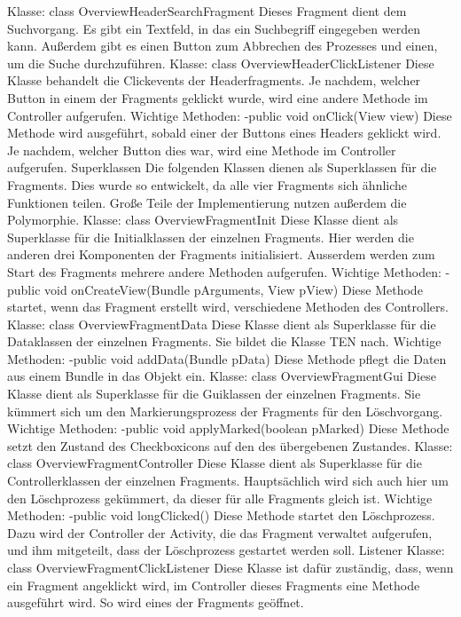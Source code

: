 Klasse: class OverviewHeaderSearchFragment
Dieses Fragment dient dem Suchvorgang. Es gibt ein Textfeld, in das ein Suchbegriff eingegeben werden kann. Außerdem gibt es einen Button zum Abbrechen des Prozesses und einen, um die Suche durchzuführen.
Klasse: class OverviewHeaderClickListener
Diese Klasse behandelt die Clickevents der Headerfragments. Je nachdem, welcher Button in einem der Fragments geklickt wurde, wird eine andere Methode im Controller aufgerufen.
Wichtige Methoden:
-public void onClick(View view)
Diese Methode wird ausgeführt, sobald einer der Buttons eines Headers geklickt wird. Je nachdem, welcher Button dies war, wird eine Methode im Controller aufgerufen.
Superklassen
Die folgenden Klassen dienen als Superklassen für die Fragments. Dies wurde so entwickelt, da alle vier Fragments sich ähnliche Funktionen teilen. Große Teile der Implementierung nutzen außerdem die Polymorphie.
Klasse: class OverviewFragmentInit
Diese Klasse dient als Superklasse für die Initialklassen der einzelnen Fragments. Hier werden die anderen drei Komponenten der Fragments initialisiert. Ausserdem werden zum Start des Fragments mehrere andere Methoden aufgerufen.
Wichtige Methoden:
-public void onCreateView(Bundle pArguments, View pView)
Diese Methode startet, wenn das Fragment erstellt wird, verschiedene Methoden des Controllers.
Klasse: class OverviewFragmentData
Diese Klasse dient als Superklasse für die Dataklassen der einzelnen Fragments. Sie bildet die Klasse TEN nach.
Wichtige Methoden:
-public void addData(Bundle pData)
Diese Methode pflegt die Daten aus einem Bundle in das Objekt ein.
Klasse: class OverviewFragmentGui
Diese Klasse dient als Superklasse für die Guiklassen der einzelnen Fragments. Sie kümmert sich um den Markierungsprozess der Fragments für den Löschvorgang.
Wichtige Methoden:
-public void applyMarked(boolean pMarked)
Diese Methode setzt den Zustand des Checkboxicons auf den des übergebenen Zustandes.
Klasse: class OverviewFragmentController
Diese Klasse dient als Superklasse für die Controllerklassen der einzelnen Fragments. Hauptsächlich wird sich auch hier um den Löschprozess gekümmert, da dieser für alle Fragments gleich ist.
Wichtige Methoden:
-public void longClicked()
Diese Methode startet den Löschprozess. Dazu wird der Controller der Activity, die das Fragment verwaltet aufgerufen, und ihm mitgeteilt, dass der Löschprozess gestartet werden soll.
Listener
Klasse: class OverviewFragmentClickListener
Diese Klasse ist dafür zuständig, dass, wenn ein Fragment angeklickt wird, im Controller dieses Fragments eine Methode ausgeführt wird. So wird eines der Fragments geöffnet.
